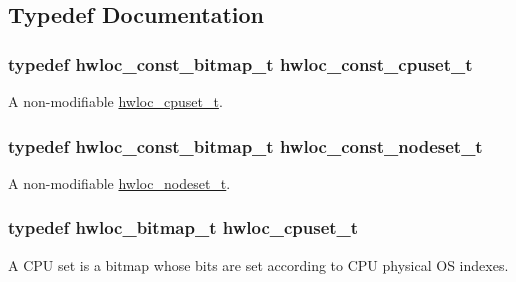 \subsection{Typedef Documentation}
\hypertarget{a00040_ga1f784433e9b606261f62d1134f6a3b25}{
\subsubsection[{hwloc\_\-const\_\-cpuset\_\-t}]{\setlength{\rightskip}{0pt plus 5cm}typedef {\bf hwloc\_\-const\_\-bitmap\_\-t} {\bf hwloc\_\-const\_\-cpuset\_\-t}}}
\label{a00040_ga1f784433e9b606261f62d1134f6a3b25}


A non-\/modifiable \hyperlink{a00040_ga4bbf39b68b6f568fb92739e7c0ea7801}{hwloc\_\-cpuset\_\-t}. 

\hypertarget{a00040_ga2f5276235841ad66a79bedad16a5a10c}{
\subsubsection[{hwloc\_\-const\_\-nodeset\_\-t}]{\setlength{\rightskip}{0pt plus 5cm}typedef {\bf hwloc\_\-const\_\-bitmap\_\-t} {\bf hwloc\_\-const\_\-nodeset\_\-t}}}
\label{a00040_ga2f5276235841ad66a79bedad16a5a10c}


A non-\/modifiable \hyperlink{a00040_ga37e35730fa7e775b5bb0afe893d6d508}{hwloc\_\-nodeset\_\-t}. 

\hypertarget{a00040_ga4bbf39b68b6f568fb92739e7c0ea7801}{
\subsubsection[{hwloc\_\-cpuset\_\-t}]{\setlength{\rightskip}{0pt plus 5cm}typedef {\bf hwloc\_\-bitmap\_\-t} {\bf hwloc\_\-cpuset\_\-t}}}
\label{a00040_ga4bbf39b68b6f568fb92739e7c0ea7801}


A CPU set is a bitmap whose bits are set according to CPU physical OS indexes. 


